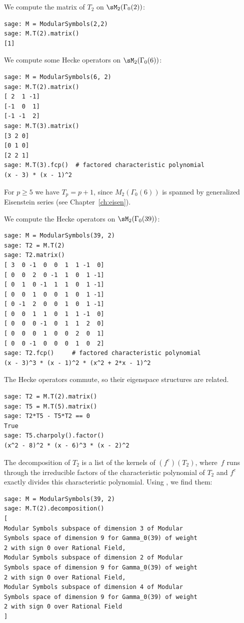 
\begin{example}
We compute the matrix of $T_2$ on $\sM_2(\Gamma_0(2))$:
\begin{verbatim}
sage: M = ModularSymbols(2,2)
sage: M.T(2).matrix()
[1]
\end{verbatim}
\end{example}


\begin{example}
We compute some Hecke operators on $\sM_2(\Gamma_0(6))$:
\begin{verbatim}
sage: M = ModularSymbols(6, 2)
sage: M.T(2).matrix()
[ 2  1 -1]
[-1  0  1]
[-1 -1  2]
sage: M.T(3).matrix()
[3 2 0]
[0 1 0]
[2 2 1]
sage: M.T(3).fcp()  # factored characteristic polynomial
(x - 3) * (x - 1)^2
\end{verbatim}
For $p\geq 5$ we have $T_p = p+1$, since $M_2(\Gamma_0(6))$ is
spanned by generalized Eisenstein series (see Chapter~\ref{ch:eisen}).
\end{example}

\begin{example}
We compute the Hecke operators on $\sM_2(\Gamma_0(39))$:
\begin{verbatim}
sage: M = ModularSymbols(39, 2)
sage: T2 = M.T(2)
sage: T2.matrix()
[ 3  0 -1  0  0  1  1 -1  0]
[ 0  0  2  0 -1  1  0  1 -1]
[ 0  1  0 -1  1  1  0  1 -1]
[ 0  0  1  0  0  1  0  1 -1]
[ 0 -1  2  0  0  1  0  1 -1]
[ 0  0  1  1  0  1  1 -1  0]
[ 0  0  0 -1  0  1  1  2  0]
[ 0  0  0  1  0  0  2  0  1]
[ 0  0 -1  0  0  0  1  0  2]
sage: T2.fcp()     # factored characteristic polynomial
(x - 3)^3 * (x - 1)^2 * (x^2 + 2*x - 1)^2
\end{verbatim}%

The Hecke operators commute, so their
eigenspace structures are related. 

\begin{verbatim}
sage: T2 = M.T(2).matrix()
sage: T5 = M.T(5).matrix()
sage: T2*T5 - T5*T2 == 0
True
sage: T5.charpoly().factor()
(x^2 - 8)^2 * (x - 6)^3 * (x - 2)^2
\end{verbatim}

The decomposition of $T_2$ is a list of the kernels of
$(f^e)(T_2)$, where~$f$ runs through the irreducible factors of the
characteristic polynomial of $T_2$ and $f^e$ exactly divides this
characteristic polynomial.  Using \sage{}, we find them:
\begin{verbatim}
sage: M = ModularSymbols(39, 2)
sage: M.T(2).decomposition()
[
Modular Symbols subspace of dimension 3 of Modular 
Symbols space of dimension 9 for Gamma_0(39) of weight 
2 with sign 0 over Rational Field,
Modular Symbols subspace of dimension 2 of Modular 
Symbols space of dimension 9 for Gamma_0(39) of weight 
2 with sign 0 over Rational Field,
Modular Symbols subspace of dimension 4 of Modular 
Symbols space of dimension 9 for Gamma_0(39) of weight 
2 with sign 0 over Rational Field
]
\end{verbatim}
\end{example}


